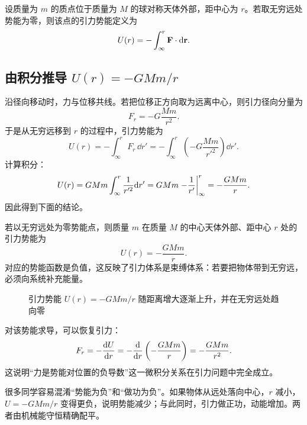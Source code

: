 \begin{definition}[引力势能]
设质量为 $m$ 的质点位于质量为 $M$ 的球对称天体外部，距中心为 $r$。若取无穷远处势能为零，则该点的引力势能定义为
\[
U(r)=-\int_{\infty}^{r}\vb{F}\cdot \dd \vb{r}.
\]
\end{definition}

\subsection{由积分推导 $U(r)=-GMm/r$}

沿径向移动时，力与位移共线。若把位移正方向取为远离中心，则引力径向分量为
\[
F_r=-G\frac{Mm}{r^2}.
\]
于是从无穷远移到 $r$ 的过程中，引力势能为
\[
U(r)=-\int_{\infty}^{r}F_r\,\dd r'=-\int_{\infty}^{r}\left(-G\frac{Mm}{r'^2}\right)\dd r'.
\]
计算积分：
\[
U(r)=G Mm\int_{\infty}^{r}\frac{1}{r'^2}\dd r' = G Mm\eval{-\frac{1}{r'}}_{\infty}^{r}=-\frac{GMm}{r}.
\]
因此得到下面的结论。

\begin{theorem}[球对称天体外部的引力势能]
若以无穷远处为零势能点，则质量 $m$ 在质量 $M$ 的中心天体外部、距中心 $r$ 处的引力势能为
\[
U(r)=-\frac{GMm}{r}.
\]
对应的势能函数是负值，这反映了引力体系是束缚体系：若要把物体带到无穷远，必须向系统补充能量。
\end{theorem}

\begin{figure}[htbp]
\centering
{}
\caption{引力势能 $U(r)=-GMm/r$ 随距离增大逐渐上升，并在无穷远处趋向零}
\end{figure}

对该势能求导，可以恢复引力：
\[
F_r=-\dv{U}{r}=-\dv{}{r}\left(-\frac{GMm}{r}\right)=-\frac{GMm}{r^2}.
\]
这说明“力是势能对位置的负导数”这一微积分关系在引力问题中完全成立。

\begin{remark}
很多同学容易混淆“势能为负”和“做功为负”。如果物体从远处落向中心，$r$ 减小，$U=-GMm/r$ 变得更负，说明势能减少；与此同时，引力做正功，动能增加。两者由机械能守恒精确配平。
\end{remark}

